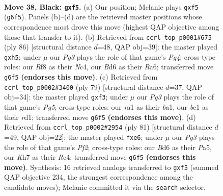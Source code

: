 \documentclass[11pt]{article}
\begin{document}
\clearpage

\begin{figure}[p]\centering
\begin{subfigure}{0.46\textwidth}\centering
\resizebox{\linewidth}{!}{%
\newchessgame
\chessboard[
  setfen={5r2/p6k/P2b2pN/1P3PP1/8/2N5/3K4/R1B5 b - - 0 38},
  showmover=false,
  pgfstyle=straightmove, color=movearrow, markmove={g6-f5}
]}
\caption{}
\end{subfigure}\hfill
\begin{subfigure}{0.46\textwidth}\centering
\resizebox{\linewidth}{!}{%
\newchessgame
\chessboard[
  setfen={8/2rk4/R1p2p2/6pp/1PN1KnP1/P7/8/8 w - - 0 44},
  showmover=false,
  pgfstyle=straightmove, color=movearrow, markmove={g4-h5}
]}
\caption{}
\end{subfigure}
\\[4pt]
\begin{subfigure}{0.46\textwidth}\centering
\resizebox{\linewidth}{!}{%
\newchessgame
\chessboard[
  setfen={8/4r3/3n1N2/3P1k2/2b3p1/1p3P2/6PP/B2R2K1 b - - 0 40},
  showmover=false,
  pgfstyle=straightmove, color=movearrow, markmove={g4-f3}
]}
\caption{}
\end{subfigure}\hfill
\begin{subfigure}{0.46\textwidth}\centering
\resizebox{\linewidth}{!}{%
\newchessgame
\chessboard[
  setfen={5k2/5p2/4P1p1/p7/2r1N1P1/5P2/P3R1K1/2b5 b - - 0 41},
  showmover=false,
  pgfstyle=straightmove, color=movearrow, markmove={f7-e6}
]}
\caption{}
\end{subfigure}
\caption{\textbf{Move 38, Black: \texttt{gxf5}.} (a) Our position; Melanie plays \texttt{gxf5} (\texttt{g6f5}). Panels (b)--(d) are the retrieved master positions whose correspondence most drove this move (highest QAP objective among those that transfer to it). (b) Retrieved from \texttt{ccrl\_top\_p0001\#675} (ply 86) [structural distance $d$=48, QAP obj=39]: the master played \texttt{gxh5}; under $\mu$ our \emph{Pg3} plays the role of that game's \emph{Pg4}; cross-type roles: our \emph{R}f8 as their \emph{N}c4, our \emph{B}d6 as their \emph{R}a6; transferred move \texttt{g6f5} \textbf{(endorses this move)}. (c) Retrieved from \texttt{ccrl\_top\_p0002\#3400} (ply 79) [structural distance $d$=37, QAP obj=34]: the master played \texttt{gxf3}; under $\mu$ our \emph{Pg3} plays the role of that game's \emph{Pg5}; cross-type roles: our \emph{r}a1 as their \emph{b}a1, our \emph{b}c1 as their \emph{r}d1; transferred move \texttt{g6f5} \textbf{(endorses this move)}. (d) Retrieved from \texttt{ccrl\_top\_p0002\#2954} (ply 81) [structural distance $d$=49, QAP obj=22]: the master played \texttt{fxe6}; under $\mu$ our \emph{Pg3} plays the role of that game's \emph{Pf2}; cross-type roles: our \emph{B}d6 as their \emph{P}a5, our \emph{K}h7 as their \emph{R}c4; transferred move \texttt{g6f5} \textbf{(endorses this move)}. Synthesis: 16 retrieved analogs transferred to \texttt{gxf5} (summed QAP objective 234, the strongest correspondence among the candidate moves); Melanie committed it via the \texttt{search} selector.}
\label{fig:thought-m75}
\end{figure}
\end{document}

